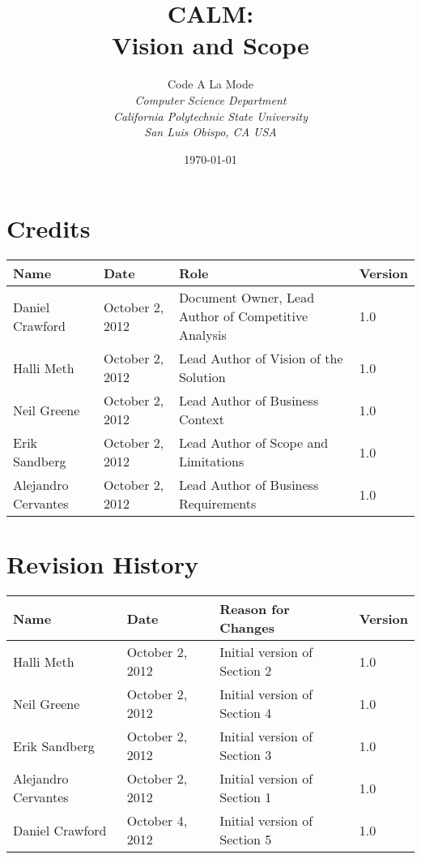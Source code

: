 \documentclass[12pt,oneside,letterpaper]{article}
\begin{document}
\title{\bfseries CALM: \\Vision and Scope}

\author {
\large{Code A La Mode}\\
\emph{Computer Science Department}\\
\emph{California Polytechnic State University}\\
\emph{San Luis Obispo, CA USA}\\
}

\date{\today}
\maketitle \thispagestyle{empty}

\pagebreak
\tableofcontents


\section*{Credits}
\begin{tabular}{|l|l|p{2.5in}|l|}
\hline
\textbf{Name}&\textbf{Date}&\textbf{Role}&\textbf{Version}\\
\hline
Daniel Crawford&October 2, 2012&Document Owner, Lead Author of Competitive Analysis&1.0\\
\hline
Halli Meth&October 2, 2012&Lead Author of Vision of the Solution&1.0\\
\hline
Neil Greene&October 2, 2012&Lead Author of Business Context&1.0\\
\hline
Erik Sandberg&October 2, 2012&Lead Author of Scope and Limitations&1.0\\
\hline
Alejandro Cervantes& October 2, 2012& Lead Author of Business Requirements&1.0\\
\hline
\end{tabular}


\section*{Revision History}
\begin{tabular}{|l|l|p{2.5in}|l|}
\hline
\textbf{Name}&\textbf{Date}&\textbf{Reason for Changes}&\textbf{Version}\\
\hline
Halli Meth&October 2, 2012&Initial version of Section 2&1.0\\
\hline
Neil Greene&October 2, 2012&Initial version of Section 4&1.0\\
\hline
Erik Sandberg&October 2, 2012&Initial version of Section 3&1.0\\
\hline
Alejandro Cervantes&October 2, 2012&Initial version of Section 1&1.0\\
\hline
Daniel Crawford&October 4, 2012&Initial version of Section 5&1.0\\
\hline
\end{tabular}
\end{document}
